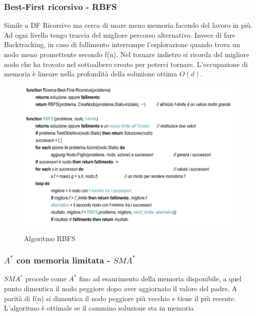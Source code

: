 \documentclass{article}
\begin{document}
\subsubsection{Best-First ricorsivo - RBFS}
Simile a DF Ricorsivo ma cerca di usare meno memoria facendo del lavoro in più. Ad ogni livello tengo traccia del migliore percorso alternativo. Invece di fare Backtracking, in caso di fallimento interrompe l'esplorazione quando trova un nodo meno promettente secondo f(n). Nel tornare indietro si ricorda del migliore nodo che ha trovato nel sottoalbero creato per poterci tornare. L'occupazione di memoria è lineare nella profondità della soluzione ottima $O(d)$.
\begin{figure}[H]
    \centering
    \includegraphics[scale=0.4]{Images/BestfirstRic.png}
    \caption{Algoritmo RBFS}
\end{figure}

\subsubsection{$A^*$ con memoria limitata - $SMA^*$}
$SMA^*$ procede come $A^*$ fino ad esaurimento della memoria disponibile, a quel punto dimentica il nodo peggiore dopo aver aggiornato il valore del padre. A parità di f(n) si dimentica il nodo peggiore più vecchio e tiene il più recente. L'algoritmo è ottimale se il cammino soluzione sta in memoria














%
%
\end{document}
